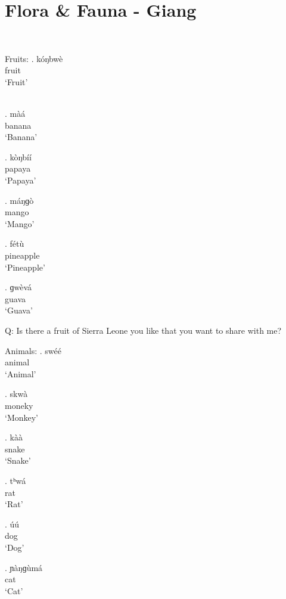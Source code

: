 \documentclass{assets/fieldnotes}
\begin{document}
 \section{Flora \& Fauna - Giang} 
\\

Fruits:
\exg. kóŋbwè\\
fruit\\
`Fruit'
\\
\\

\exg. màá\\
banana\\
`Banana'

\exg. kòŋbíí\\
papaya\\
`Papaya'

\exg. máŋɡò\\
mango\\
`Mango'

\exg. fétù\\
pineapple\\
`Pineapple'

\exg. ɡwèvá\\
guava\\
`Guava'

Q: Is there a fruit of Sierra Leone you like that you want to share with me?

Animals:
\exg. swéé\\
animal\\
`Animal'


\exg. skwà\\
moneky\\
`Monkey'

\exg. kàà\\
snake\\
`Snake'

\exg. tʰwá\\
rat\\
`Rat'

\exg. úú\\
dog\\
`Dog'

\exg. ɲàŋɡùmá\\
cat\\
`Cat'
\end{document}
